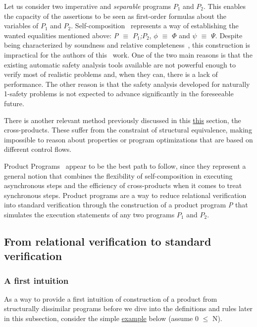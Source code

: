 Let us consider two imperative and \emph{separable} programs \emph{$P_1$} and \emph{$P_2$}.
This enables the capacity of the assertions to be seen as first-order formulas about the variables of \emph{$P_1$} and \emph{$P_2$}.
Self-composition~\cite{DBLP:conf/csfw/BartheDR04} represents a way of establishing the wanted equalities mentioned above: \emph{P $\equiv$ $P_1$;$P_2$}, \emph{$\phi$ $\equiv$ $\Phi$} and \emph{$\psi$ $\equiv$ $\Psi$}.
Despite being characterized by soundness and relative completeness~\cite{DBLP:journals/jlp/BartheCK16}, this construction is impractical for the authors of this~\cite{DBLP:conf/sas/TerauchiA05} work.
One of the two main reasons is that the existing automatic safety analysis tools available are not powerful enough to verify most of realistic problems and, when they can, there is a lack of performance.
The other reason is that the safety analysis developed for naturally 1-safety problems is not expected to advance significantly in the foreseeable future.

There is another relevant method previously discussed in this \hyperref[sec:cross_products]{this} section, the cross-products.
These suffer from the constraint of structural equivalence, making impossible to reason about properties or program optimizations that are based on different control flows.

Product Programs~\cite{DBLP:conf/fm/BartheCK11} appear to be the best path to follow, since they represent a general notion that combines the flexibility of self-composition in executing asynchronous steps and the efficiency of cross-products when it comes to treat synchronous steps. 
Product programs are a way to reduce relational verification into standard verification through the construction of a product program \emph{P} that simulates the execution statements of any two programs \emph{$P_1$} and \emph{$P_2$}.


\subsection{From relational verification to standard verification} 
\label{subsec:product_programs_relverif_to_stdverif}

\FloatBarrier
\subsubsection{A first intuition} 
\label{subsubsec:product_programs_intuition}

As a way to provide a first intuition of construction of a product from structurally dissimilar programs before we dive into the definitions and rules later in this subsection, consider the simple \hyperref[fig:pp_first_intuition]{example} below (assume 0 $\leq$ N).

